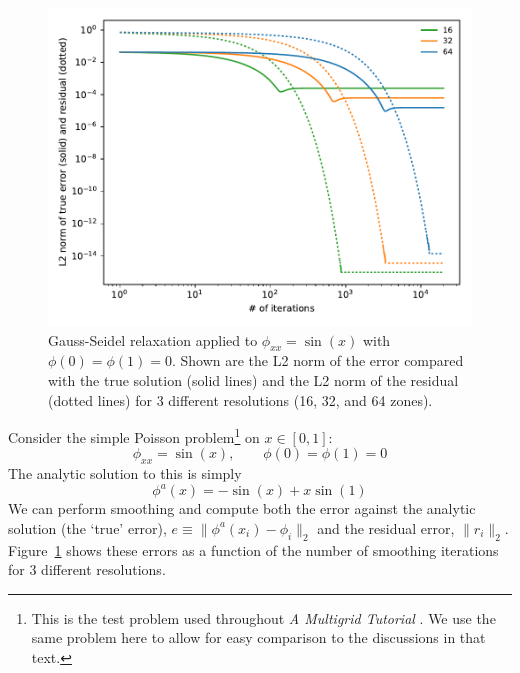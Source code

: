 \begin{figure}
\centering
\includegraphics[width=\linewidth]{smooth-error}
\caption[Convergence as a function of number of iterations using Gauss-Seidel relaxation]{\label{fig:smootherror} Gauss-Seidel relaxation applied to
  $\phi_{xx} = \sin(x)$ with $\phi(0) = \phi(1) = 0$.  Shown are the
  L2 norm of the error compared with the true solution (solid lines)
  and the L2 norm of the residual (dotted lines) for 3 different
  resolutions (16, 32, and 64 zones). \\
  }
\end{figure}

Consider the simple Poisson problem\footnote{This is the test problem
  used throughout {\em A Multigrid Tutorial} \cite{multigridtutorial}.
  We use the same problem here to allow for easy comparison to the
  discussions in that text.} on $x \in [0,1]$:
\begin{equation}
\phi_{xx} = \sin(x), \qquad \phi(0) = \phi(1) = 0
\end{equation}
The analytic solution to this is simply 
\begin{equation}
\phi^a(x) = -\sin(x) + x \sin(1)
\end{equation}
We can perform smoothing and compute both the error against the
analytic solution (the `true' error), $e \equiv \| \phi^a(x_i) - \phi_i \|_2$ and the
residual error, $\| r_i \|_2$.  Figure~\ref{fig:smootherror} shows these
errors as a function of the number of smoothing iterations for 3
different resolutions.

